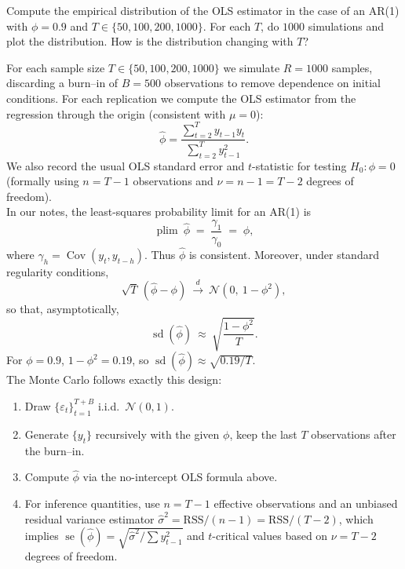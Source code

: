 \documentclass[dvipsnames,11pt]{article}
\begin{document}
    Compute the empirical distribution of the OLS estimator in the case of an AR(1) with $\phi=0.9$ and $T\in\{50,100,200,1000\}$. For each $T$, do $1000$ simulations and plot the distribution. How is the distribution changing with $T$?

    \begin{solution}

        For each sample size $T\in\{50,100,200,1000\}$ we simulate $R=1000$ samples, discarding a burn–in of $B=500$ observations to remove dependence on initial conditions. For each replication we compute the OLS estimator from the regression through the origin (consistent with $\mu=0$):
        \[
        \widehat\phi=\frac{\sum_{t=2}^{T} y_{t-1}y_t}{\sum_{t=2}^{T} y_{t-1}^2}.
        \]
        We also record the usual OLS standard error and $t$-statistic for testing $H_0:\phi=0$ (formally using $n=T-1$ observations and $\nu=n-1=T-2$ degrees of freedom). \\

        In our notes, the least-squares probability limit for an AR(1) is
        \[
        \operatorname*{plim}\ \widehat\phi \;=\; \frac{\gamma_1}{\gamma_0}\;=\;\phi,
        \]
        where $\gamma_h=\operatorname{Cov}(y_t,y_{t-h})$. Thus $\widehat\phi$ is consistent. Moreover, under standard regularity conditions,
        \[
        \sqrt{T}\,(\widehat\phi-\phi)\ \xrightarrow{d}\ \mathcal{N}\!\left(0,\ 1-\phi^2\right),
        \]
        so that, asymptotically,
        \[
        \operatorname{sd}(\widehat\phi)\ \approx\ \sqrt{\frac{1-\phi^2}{T}}.
        \]
        For $\phi=0.9$, $1-\phi^2=0.19$, so $\operatorname{sd}(\widehat\phi)\approx \sqrt{0.19/T}$. \\

        The Monte Carlo follows exactly this design:
        
        \begin{enumerate}
            \item Draw $\{\varepsilon_t\}_{t=1}^{T+B}$ i.i.d.\ $\mathcal{N}(0,1)$.
          
            \item Generate $\{y_t\}$ recursively with the given $\phi$, keep the last $T$ observations after the burn–in.
          
            \item Compute $\widehat\phi$ via the no-intercept OLS formula above.
          
            \item For inference quantities, use $n=T-1$ effective observations and an unbiased residual variance estimator $\widehat\sigma^2=\text{RSS}/(n-1)=\text{RSS}/(T-2)$, which implies $\operatorname{se}(\widehat\phi)=\sqrt{\widehat\sigma^2/\sum y_{t-1}^2}$ and $t$-critical values based on $\nu=T-2$ degrees of freedom.
        \end{enumerate}


\end{solution}
\end{document}
